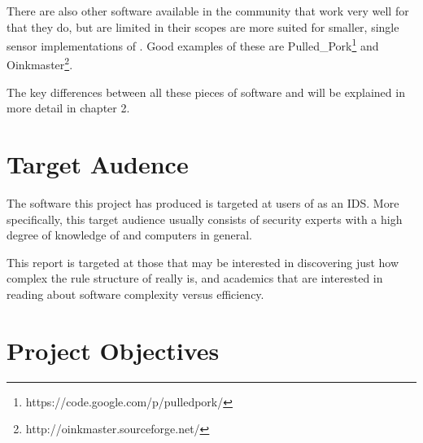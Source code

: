 There are also other software available in the \snort{} community that work very
well for that they do, but are limited in their scopes are more suited for
smaller, single sensor implementations of \snort{}. Good examples of these
are Pulled\_Pork\footnote{https://code.google.com/p/pulledpork/} and
Oinkmaster\footnote{http://oinkmaster.sourceforge.net/}.

The key differences between all these pieces of software and \snowman{} will be
explained in more detail in chapter 2.

\section{Target Audence}
The software this project has produced is targeted at users of \snort{} as an IDS.
More specifically, this target audience usually consists of security experts
with a high degree of knowledge of \snort{} and computers in general.

This report is targeted at those that may be interested in discovering just how
complex the rule structure of \snort{} really is, and academics that are interested
in reading about software complexity versus efficiency.

\section{Project Objectives}
